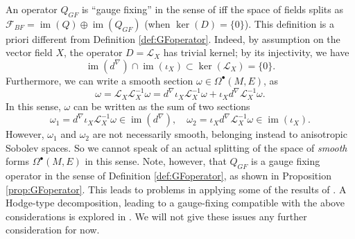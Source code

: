 \documentclass[reqno]{amsart}
\theoremstyle{definition}
\theoremstyle{remark}
\renewcommand{\d}{d^\nabla}
\newcommand{\F}{\mathcal{F}}
\renewcommand{\L}{\mathcal{L}}
\DeclareMathOperator{\im}{im}
\begin{document}
\begin{rmk}\label{rmk:costellospilittinganisotropic}
An operator $Q_{GF}$ is ``gauge fixing'' in the sense of \cite{costello} iff the space of fields splits as $\F_{BF} = \im(Q)\oplus\im(Q_{GF})$ (when $\ker(D)=\{0\}$). This definition is a priori different from Definition \ref{def:GFoperator}.  
Indeed, by assumption on the vector field $X$, the operator $D=\L_X$ has trivial kernel; by its injectivity, we have 
$$\im(\d)\cap\im(\iota_X) \subset \ker(\L_X) = \{0\}.$$ Furthermore, we can write a smooth section $\omega \in \Omega^\bullet(M,E)$, as
$$\omega = \L_X\L_X^{-1}\omega = \d\iota_X\L_X^{-1}\omega + \iota_X\d\L_X^{-1}\omega.$$
In this sense, $\omega$ can be written as the sum of two sections
$$\omega_1 = \d\iota_X\L_X^{-1}\omega \in \im(\d), \quad \omega_2 = \iota_X\d\L_X^{-1}\omega \in \im(\iota_X).$$
However, $\omega_1$ and $\omega_2$ are not necessarily smooth, belonging instead to anisotropic Sobolev spaces. So we cannot speak of an actual splitting of the space of \emph{smooth} forms $\Omega^\bullet(M,E)$ in this sense. Note, however, that $Q_{GF}$ is a gauge fixing operator in the sense of Definition \ref{def:GFoperator}, as shown in Proposition \ref{prop:GFoperator}. This leads to problems in applying some of the results of \cite{costello}. A Hodge-type decomposition, leading to a gauge-fixing compatible with the above considerations is explored in \cite[Section 4.2]{Dang_Riviere}. We will not give these issues any further consideration for now.
\end{rmk}
\end{document}
